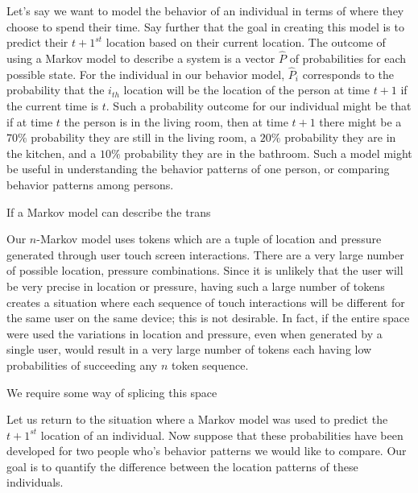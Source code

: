 Let's say we want to model the behavior
of an individual in terms of where 
they choose to spend their time.
Say further that the goal in creating
this model is to predict their $t+1^{st}$ location
based on their current location.
%
The outcome of using a Markov model to describe a system
is a vector $\hat{P}$ of probabilities for each possible state.
For the individual in our behavior model,
$\hat{P}_i$ corresponds to the probability that the $i_{th}$ location
will be the location of the person at time $t+1$ if the current time is $t$.
%
Such a probability outcome for our individual might be
that if at time $t$ the person is in the living room,
then at time $t+1$ there might be 
a $70\%$ probability they are still in the living room,
a $20\%$ probability they are in the kitchen, and
a $10\%$ probability they are in the bathroom.
%
Such a model might be useful in understanding 
the behavior patterns of one person, or
comparing behavior patterns among persons.

If a Markov model can describe the trans



Our $n$-Markov model uses tokens
which are a tuple of location and pressure
generated through user touch screen interactions. 
There are a very large number of possible
location, pressure combinations.
Since it is unlikely that the user will be
very precise in location or pressure,
having such a large number of tokens
creates a situation where each sequence of 
touch interactions will be different
for the same user on the same device;
this is not desirable.
In fact, if the entire space were used 
the variations in location and pressure,
even when generated by a single user,
would result in a very large number of tokens
each having low probabilities of succeeding any
$n$ token sequence.

We require some way of splicing this space

Let us return to the situation where
a Markov model was used to predict the $t+1^{st}$ location
of an individual.
Now suppose that these probabilities have been developed for
two people who's behavior patterns we would like to
compare.
Our goal is to quantify the difference between
the location patterns of these individuals.

